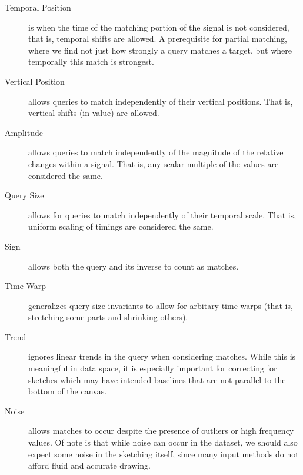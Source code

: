 \begin{description}
	\item[Temporal Position] is when the time of the matching portion of the signal is not considered, that is, temporal shifts are allowed.  A prerequisite for partial matching, where we find not just how strongly a query matches a target, but where temporally this match is strongest.
	\item[Vertical Position] allows queries to match independently of their vertical positions. That is, vertical shifts (in value) are allowed.
	\item[Amplitude]  allows queries to match independently of the magnitude of the relative changes within a signal. That is, any scalar multiple of the values are considered the same.
	\item[Query Size] allows for queries to match independently of their temporal scale. That is, uniform scaling of timings are considered the same.
	\item[Sign] allows both the query and its inverse to count as matches.
	\item[Time Warp] generalizes query size invariants to allow for arbitary time warps (that is, stretching some parts and shrinking others).
	\item[Trend] ignores linear trends in the query when considering matches. While this is meaningful in data space, it is especially important for correcting for sketches which may have intended baselines that are not parallel to the bottom of the canvas.
	\item[Noise] allows matches to occur despite the presence of outliers or high frequency values. Of note is that while noise can occur in the dataset, we should also expect some noise in the sketching itself, since many input methods do not afford fluid and accurate drawing.
\end{description}

